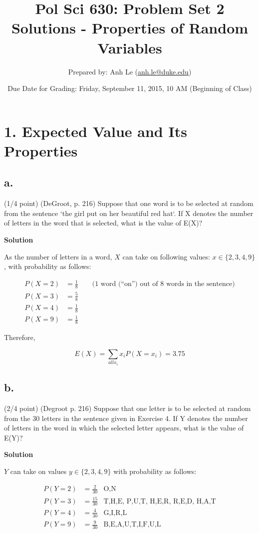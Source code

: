 \documentclass{article}\usepackage[]{graphicx}\usepackage[]{color}
\title{Pol Sci 630: Problem Set 2 Solutions - Properties of Random Variables}
\author{Prepared by: Anh Le (\href{mailto:anh.le@duke.edu}{anh.le@duke.edu})}
\date{Due Date for Grading: Friday, September 11, 2015, 10 AM (Beginning of Class)}
\begin{document}
\maketitle

\section*{1. Expected Value and Its Properties}

\subsection*{a.} (1/4 point) (DeGroot, p. 216) Suppose that one word is to be selected at random from the sentence `the girl put on her beautiful red hat`. If X denotes the number of letters in the word that is selected, what is the value of E(X)?

\textbf{Solution}

As the number of letters in a word, $X$ can take on following values: $x \in \{2, 3, 4, 9 \}$, with probability as follows:

\begin{align}
P(X = 2) &= \frac{1}{8} \qquad \text{(1 word (``on'') out of 8 words in the sentence)} \\
P(X = 3) &= \frac{5}{8} \\
P(X = 4) &= \frac{1}{8} \\
P(X = 9) &= \frac{1}{8}
\end{align}

Therefore,

$$E(X) = \sum_{all x_i} x_i P(X = x_i) = 3.75$$

\subsection*{b.} (2/4 point) (Degroot p. 216) Suppose that one letter is to be selected at random from
the 30 letters in the sentence given in Exercise 4. If Y
denotes the number of letters in the word in which the
selected letter appears, what is the value of E(Y)?

\textbf{Solution}

$Y$ can take on values $y \in \{2, 3, 4, 9 \}$ with probability as follows:

\begin{align}
P(Y = 2) &= \frac{2}{30} &\text{O,N} \\
P(Y = 3) &= \frac{15}{30} &\text{T,H,E, P,U,T, H,E,R, R,E,D, H,A,T} \\
P(Y = 4) &= \frac{4}{30} &\text{G,I,R,L} \\
P(Y = 9) &= \frac{9}{30} &\text{B,E,A,U,T,I,F,U,L}
\end{align}
\end{document}
